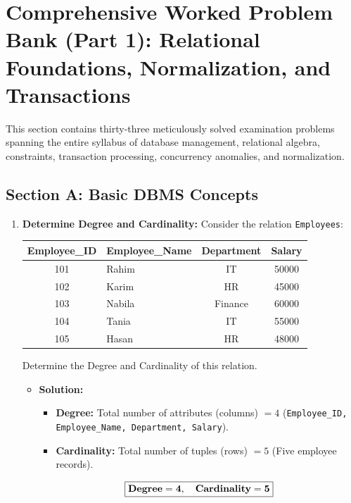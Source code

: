 \newpage
\section{Comprehensive Worked Problem Bank (Part 1): Relational Foundations, Normalization, and Transactions}

This section contains thirty-three meticulously solved examination problems spanning the entire syllabus of database management, relational algebra, constraints, transaction processing, concurrency anomalies, and normalization.

\subsection{Section A: Basic DBMS Concepts}

\begin{enumerate}[label=\textbf{Problem \arabic*.},leftmargin=1.5cm]
\item \textbf{Determine Degree and Cardinality:}
Consider the relation \texttt{Employees}:
\begin{table}[htbp]
\centering
\begin{tabularx}{0.8\textwidth}{c l c c}
\toprule
\textbf{Employee\_ID} & \textbf{Employee\_Name} & \textbf{Department} & \textbf{Salary} \\
\midrule
101 & Rahim & IT & 50000 \\
102 & Karim & HR & 45000 \\
103 & Nabila & Finance & 60000 \\
104 & Tania & IT & 55000 \\
105 & Hasan & HR & 48000 \\
\bottomrule
\end{tabularx}
\end{table}
Determine the Degree and Cardinality of this relation.
\begin{itemize}
\item \textbf{Solution:}
\begin{itemize}
\item \textbf{Degree:} Total number of attributes (columns) $= 4$ (\texttt{Employee\_ID, Employee\_Name, Department, Salary}).
\item \textbf{Cardinality:} Total number of tuples (rows) $= 5$ (Five employee records).
\end{itemize}
\[ \boxed{\text{\textbf{Degree}} = \mathbf{4}, \quad \text{\textbf{Cardinality}} = \mathbf{5}} \]
\end{itemize}


\end{enumerate}
